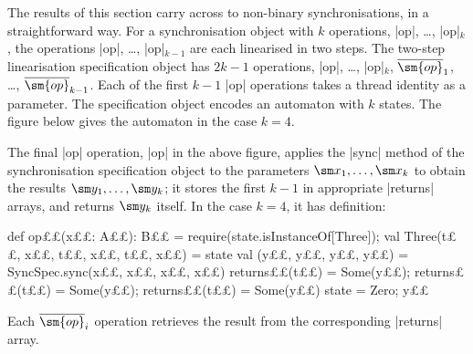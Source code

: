 The results of this section carry across to non-binary synchronisations, in a
straightforward way.  For a synchronisation object with $k$ operations,
|op|, \ldots, |op|$_k$, the operations |op|, \ldots, |op|$_{k-1}$ are
each linearised in two steps.  The two-step linearisation specification object
has $2k-1$ operations, |op|, \ldots, |op|$_k$, $\overline{\sm{op}}_1$,
\ldots, $\overline{\sm{op}}_{k-1}$.  Each of the first $k - 1$ |op| operations
takes a thread identity as a parameter.  The specification object encodes an
automaton with $k$ states.  The figure below gives the automaton in the case
$k = 4$.
%
\begin{center}
\end{center}
%
The final |op| operation, |op| in the above figure, applies the |sync|
method of the synchronisation specification object to the parameters $\sm x_1,
\ldots, \sm x_k$ to obtain the results $\sm y_1, \ldots, \sm y_k$; it stores
the first $k-1$ in appropriate |returns| arrays, and returns $\sm y_k$
itself.  In the case $k=4$, it has definition:
%
\begin{scala}
  def op££(x££: A££): B££ = {
    require(state.isInstanceOf[Three]); val Three(t££, x££, t££, x££, t££, x££) = state
    val (y££, y££, y££, y££) = SyncSpec.sync(x££, x££, x££, x££) 
    returns££(t££) = Some(y££); returns££(t££) = Some(y££); returns££(t££) = Some(y££)
    state = Zero; y££
  }
\end{scala}
%
Each $\overline{\sm{op}}_i$ operation retrieves the result from the
corresponding |returns| array.
